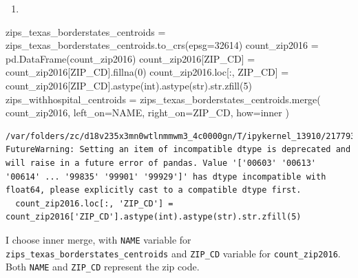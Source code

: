 \documentclass[
  letterpaper,
  DIV=11,
  numbers=noendperiod]{scrartcl}
\newenvironment{Shaded}{\begin{snugshade}}{\end{snugshade}}
\newcommand{\BuiltInTok}[1]{\textcolor[rgb]{0.00,0.23,0.31}{#1}}
\newcommand{\DecValTok}[1]{\textcolor[rgb]{0.68,0.00,0.00}{#1}}
\newcommand{\NormalTok}[1]{\textcolor[rgb]{0.00,0.23,0.31}{#1}}
\newcommand{\OperatorTok}[1]{\textcolor[rgb]{0.37,0.37,0.37}{#1}}
\newcommand{\StringTok}[1]{\textcolor[rgb]{0.13,0.47,0.30}{#1}}
\providecommand{\tightlist}{%
  \setlength{\itemsep}{0pt}\setlength{\parskip}{0pt}}\usepackage{longtable,booktabs,array}
\begin{document}
\begin{enumerate}
\def\labelenumi{\arabic{enumi}.}
\setcounter{enumi}{2}
\tightlist
\item
\end{enumerate}

\begin{Shaded}
\begin{Highlighting}[]
\NormalTok{zips\_texas\_borderstates\_centroids }\OperatorTok{=}\NormalTok{ zips\_texas\_borderstates\_centroids.to\_crs(epsg}\OperatorTok{=}\DecValTok{32614}\NormalTok{)}
\NormalTok{count\_zip2016 }\OperatorTok{=}\NormalTok{ pd.DataFrame(count\_zip2016)}
\NormalTok{count\_zip2016[}\StringTok{\textquotesingle{}ZIP\_CD\textquotesingle{}}\NormalTok{] }\OperatorTok{=}\NormalTok{ count\_zip2016[}\StringTok{\textquotesingle{}ZIP\_CD\textquotesingle{}}\NormalTok{].fillna(}\DecValTok{0}\NormalTok{)}
\NormalTok{count\_zip2016.loc[:, }\StringTok{\textquotesingle{}ZIP\_CD\textquotesingle{}}\NormalTok{] }\OperatorTok{=}\NormalTok{ count\_zip2016[}\StringTok{\textquotesingle{}ZIP\_CD\textquotesingle{}}\NormalTok{].astype(}\BuiltInTok{int}\NormalTok{).astype(}\BuiltInTok{str}\NormalTok{).}\BuiltInTok{str}\NormalTok{.zfill(}\DecValTok{5}\NormalTok{)}
\NormalTok{zips\_withhospital\_centroids }\OperatorTok{=}\NormalTok{ zips\_texas\_borderstates\_centroids.merge(}
\NormalTok{    count\_zip2016,}
\NormalTok{    left\_on}\OperatorTok{=}\StringTok{\textquotesingle{}NAME\textquotesingle{}}\NormalTok{,}
\NormalTok{    right\_on}\OperatorTok{=}\StringTok{\textquotesingle{}ZIP\_CD\textquotesingle{}}\NormalTok{,}
\NormalTok{    how}\OperatorTok{=}\StringTok{\textquotesingle{}inner\textquotesingle{}}
\NormalTok{)}
\end{Highlighting}
\end{Shaded}

\begin{verbatim}
/var/folders/zc/d18v235x3mn0wtlnmmwm3_4c0000gn/T/ipykernel_13910/2177933344.py:4: FutureWarning: Setting an item of incompatible dtype is deprecated and will raise in a future error of pandas. Value '['00603' '00613' '00614' ... '99835' '99901' '99929']' has dtype incompatible with float64, please explicitly cast to a compatible dtype first.
  count_zip2016.loc[:, 'ZIP_CD'] = count_zip2016['ZIP_CD'].astype(int).astype(str).str.zfill(5)
\end{verbatim}

I choose inner merge, with \texttt{NAME} variable for
\texttt{zips\_texas\_borderstates\_centroids} and \texttt{ZIP\_CD}
variable for \texttt{count\_zip2016}. Both \texttt{NAME} and
\texttt{ZIP\_CD} represent the zip code.
\end{document}
